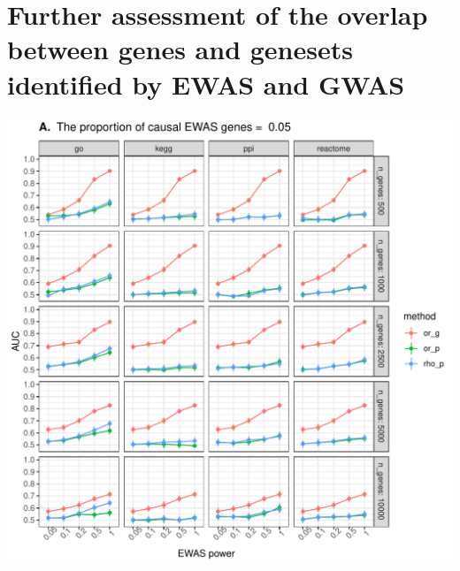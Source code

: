 \documentclass[11pt,oneside]{bristolthesis}
\begin{document}
\appendix

\hypertarget{further-assessment-of-the-overlap-between-genes-and-genesets-identified-by-ewas-and-gwas}{%
\chapter{Further assessment of the overlap between genes and genesets identified by EWAS and GWAS}\label{further-assessment-of-the-overlap-between-genes-and-genesets-identified-by-ewas-and-gwas}}




\begin{center}\includegraphics[width=1\linewidth]{figure/06-ewas_gwas_comparison/method_test_gene_up_all/PEC_0.05} \end{center}
\end{document}
